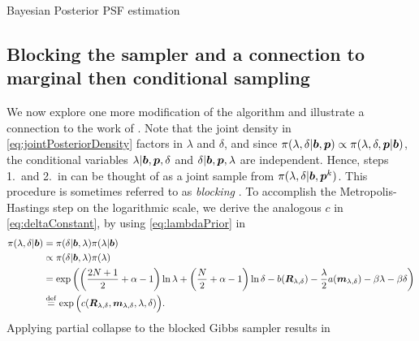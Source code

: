 \begin{chapter}{Bayesian Posterior PSF estimation}
\subsection{Blocking the sampler and a connection to marginal then conditional sampling}

We now explore one more modification of the algorithm and illustrate a connection to the work of \citep{fox2015fast}.
Note that the joint density in \eqref{eq:jointPosteriorDensity} factors in $\lambda$ and $\delta$, and since $\pi(\lambda,\delta|\mbox{\boldmath$b$},\mbox{\boldmath$p$}) \propto \pi(\lambda,\delta,\mbox{\boldmath$p$}|\mbox{\boldmath$b$})$, the conditional variables $\lambda|\mbox{\boldmath$b$}, \mbox{\boldmath$p$},\delta$ and $\delta|\mbox{\boldmath$b$},\mbox{\boldmath$p$},\lambda$ are independent.
Hence, steps 1.~and 2.~in  can be thought of as a joint sample from $\pi(\lambda,\delta|\mbox{\boldmath$b$},\mbox{\boldmath$p$}^k)$.
This procedure is sometimes referred to as \emph{blocking} \citep{liu2008monte}.
To accomplish the Metropolis-Hastings step on the logarithmic scale, we derive the analogous $c$ in \eqref{eq:deltaConstant}, by using \eqref{eq:lambdaPrior} in
\begin{align}
  \pi(\lambda,\delta|\mbox{\boldmath$b$}) 
    &=\pi(\delta|\mbox{\boldmath$b$},\lambda)\pi(\lambda|\mbox{\boldmath$b$}) \nonumber\\
    &\propto \pi(\delta|\mbox{\boldmath$b$},\lambda)\pi(\lambda) \nonumber\\
    &= \exp\left( \left(\frac {2N+1}2 +\alpha - 1\right)\ln\lambda + \left(\frac N2 +\alpha - 1\right)\ln\delta - b(\mbox{\boldmath$R$}_{\lambda,\delta}) -\frac \lambda 2 a(\mbox{\boldmath$m$}_{\lambda,\delta}) -\beta\lambda -\beta\delta  \right)\nonumber \\
    &\stackrel{\rm def}{=} \exp\Big(c(\mbox{\boldmath$R$}_{\lambda,\delta},\mbox{\boldmath$m$}_{\lambda,\delta},\lambda,\delta)\Big). \label{eq:jointConstant}
\end{align}
Applying partial collapse to the blocked Gibbs sampler results in 


\end{chapter}
